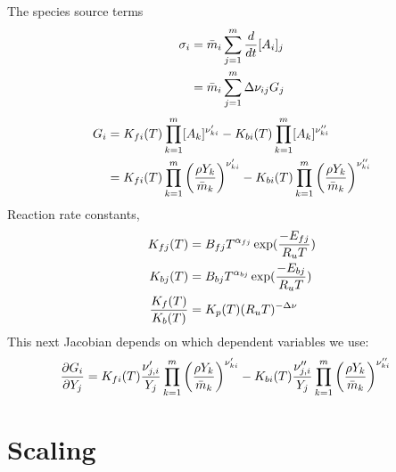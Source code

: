 \documentclass{article}
\begin{document}
The species source terms
\begin{align}
    \sigma_i & = \bar{m}_i \sum_{j=1}^m {d \over dt} [A_i]_j \\
             & = \bar{m}_i \sum_{j=1}^m \Delta \nu_{ij} G_j
\end{align}
\begin{align}
    G_i &=  K_{fi}(T)\prod_{k=1}^{m} [A_k]^{\nu_{ki}'} -  K_{bi}(T)\prod_{k=1}^{m} [A_k]^{\nu_{ki}''} \\
        &=  K_{fi}(T)\prod_{k=1}^{m} \left({\rho Y_k \over \bar{m}_k} \right)^{\nu_{ki}'}
         -  K_{bi}(T)\prod_{k=1}^{m}  \left({\rho Y_k \over \bar{m}_k} \right)^{\nu_{ki}''}
\end{align}
Reaction rate constants, 
\begin{align}
  K_{fj}(T) &=  B_{fj} T^{\alpha_{fj}} \exp({-E_{fj} \over R_u T}) \\
  K_{bj}(T) &=  B_{bj} T^{\alpha_{bj}} \exp({-E_{bj} \over R_u T}) \\
  {K_f(T)\over K_b(T)} &= K_p(T) (R_u T)^{-\Delta \nu}
\end{align}
This next Jacobian depends on which dependent variables we use:
\begin{align}
    {\partial G_i \over \partial Y_j} &= 
            K_{fi}(T) {\nu_{j,i}' \over Y_j}  \prod_{k=1}^{m} \left({\rho Y_k \over \bar{m}_k} \right)^{\nu_{ki}'}
         -  K_{bi}(T){\nu_{j,i}''\over Y_j}  \prod_{k=1}^{m}  \left({\rho Y_k \over \bar{m}_k} \right)^{\nu_{ki}''}
\end{align}

\section{Scaling}

\newcommand{\rhot}{\tilde{\rho}}
\newcommand{\jvt}{\tilde{\jv}}
\newcommand{\vvt}{\tilde{\vv}}
\newcommand{\sigmat}{\tilde{\sigma}}
\newcommand{\pt}{\tilde{p}}
\newcommand{\ttt}{\tilde{t}}
\newcommand{\Tt}{\tilde{T}}
\newcommand{\gradt}{\tilde{\grad}}
\newcommand{\Deltat}{\tilde{\Delta}}
\newcommand{\lambdat}{\tilde{\lambda}}
\newcommand{\ct}{\tilde{c}}
\newcommand{\hht}{\tilde{h}}
\newcommand{\Rt}{\tilde{R}}
\newcommand{\Dt}{\tilde{D}}
\newcommand{\mut}{\tilde{\mu}}
\newcommand{\Phit}{\tilde{\Phi}}
\end{document}
